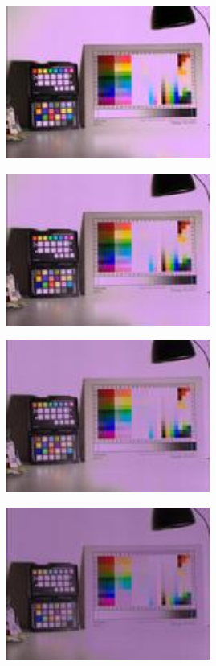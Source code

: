 \begin{center}
\includegraphics[height=5cm]{images/100ms-1ms-8-tiny}
\end{center}

\begin{center}
\includegraphics[height=5cm]{images/100ms-1ms-16-tiny}
\end{center}

\begin{center}
\includegraphics[height=5cm]{images/100ms-1ms-24-tiny}
\end{center}

\begin{center}
\includegraphics[height=5cm]{images/100ms-1ms-32-tiny}
\end{center}

